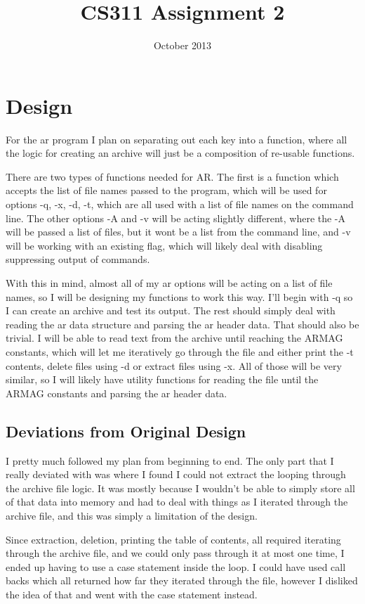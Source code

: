 \documentclass[letterpaper,10pt]{article}
\title{CS311 Assignment 2}
\author{\name}
\date{October 2013}
\begin{document}
\maketitle

\section{Design}

For the ar program I plan on separating out each key into a function, where all
the logic for creating an archive will just be a composition of re-usable
functions.

There are two types of functions needed for AR. The first is a function which
accepts the list of file names passed to the program, which will be used for
options -q, -x, -d, -t, which are all used with a list of file names on the
command line. The other options -A and -v will be acting slightly different,
where the -A will be passed a list of files, but it wont be a list from the
command line, and -v will be working with an existing flag, which will likely
deal with disabling suppressing output of commands.

With this in mind, almost all of my ar options will be acting on a list of file
names, so I will be designing my functions to work this way. I'll begin with -q
so I can create an archive and test its output. The rest should simply deal
with reading the ar data structure and parsing the ar header data. That should
also be trivial. I will be able to read text from the archive until reaching
the ARMAG constants, which will let me iteratively go through the file and
either print the -t contents, delete files using -d or extract files using -x.
All of those will be very similar, so I will likely have utility functions for
reading the file until the ARMAG constants and parsing the ar header data.

\subsection{Deviations from Original Design}
I pretty much followed my plan from beginning to end. The only part that I
really deviated with was where I found I could not extract the looping through
the archive file logic. It was mostly because I wouldn't be able to simply
store all of that data into memory and had to deal with things as I iterated
through the archive file, and this was simply a limitation of the design.

Since extraction, deletion, printing the table of contents, all required
iterating through the archive file, and we could only pass through it at most
one time, I ended up having to use a case statement inside the loop. I could
have used call backs which all returned how far they iterated through the file,
however I disliked the idea of that and went with the case statement instead.
\end{document}
